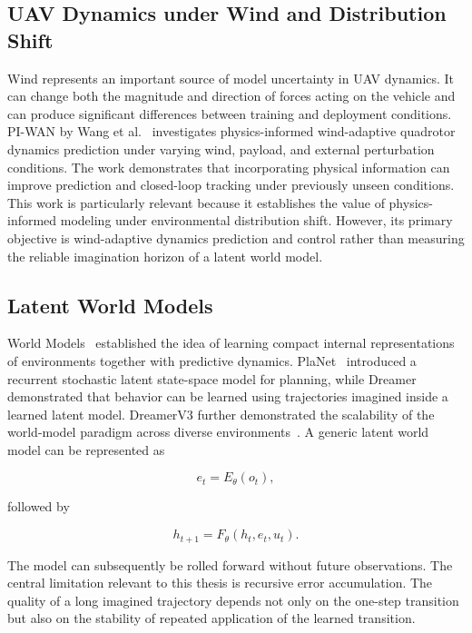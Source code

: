 \documentclass[conference]{IEEEtran}
\begin{document}
\subsection{UAV Dynamics under Wind and Distribution Shift}

Wind represents an important source of model uncertainty in UAV
dynamics. It can change both the magnitude and direction of forces
acting on the vehicle and can produce significant differences between
training and deployment conditions. PI-WAN by Wang et al.~\cite{wang2025piwan} investigates physics-informed
wind-adaptive quadrotor dynamics prediction under varying wind,
payload, and external perturbation conditions. The work demonstrates
that incorporating physical information can improve prediction and
closed-loop tracking under previously unseen conditions. This work is particularly relevant because it establishes the value of
physics-informed modeling under environmental distribution shift.
However, its primary objective is wind-adaptive dynamics prediction and
control rather than measuring the reliable imagination horizon of a
latent world model.


\subsection{Latent World Models}

World Models~\cite{ha2018worldmodels} established the idea of learning
compact internal representations of environments together with
predictive dynamics. PlaNet~\cite{hafner2019planet} introduced a
recurrent stochastic latent state-space model for planning, while
Dreamer~\cite{hafner2020dream} demonstrated that behavior can be learned
using trajectories imagined inside a learned latent model. DreamerV3
further demonstrated the scalability of the world-model paradigm
across diverse environments~\cite{hafner2023mastering}. A generic latent world model can be represented as

\begin{equation}
e_t = E_{\theta}(o_t),
\end{equation}

followed by

\begin{equation}
h_{t+1}
=
F_{\theta}(h_t,e_t,u_t).
\end{equation}

The model can subsequently be rolled forward without future
observations. The central limitation relevant to this thesis is recursive error
accumulation. The quality of a long imagined trajectory depends not
only on the one-step transition but also on the stability of repeated
application of the learned transition.
\end{document}
